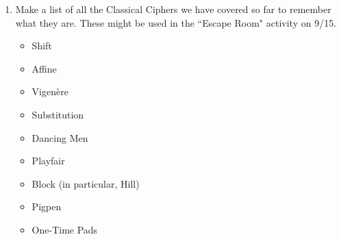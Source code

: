 \documentclass[12pt]{amsart}
\theoremstyle{plain}
\theoremstyle{definition}
\begin{document}
\begin{enumerate}[1.]
	 \item Make a list of all the Classical Ciphers we have covered so far to remember what they are.  These might be used in the ``Escape Room" activity on 9/15.
	\begin{framed}
	\begin{itemize}
		\item Shift
		\item Affine
		\item Vigen\`{e}re
		\item Substitution
		\item Dancing Men
		\item Playfair
		\item Block (in particular, Hill)
		\item Pigpen
		\item One-Time Pads
	\end{itemize}
	\end{framed}
\end{enumerate}

	
\end{document}
